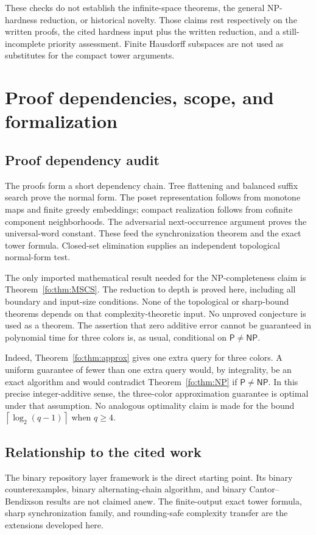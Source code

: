\documentclass[11pt,letterpaper]{article}
\numberwithin{equation}{section}
\theoremstyle{definition}
\theoremstyle{remark}
\theoremstyle{definition}
\newcommand{\ceil}[1]{\left\lceil#1\right\rceil}
\newcommand{\NP}{\mathsf{NP}}
\newcommand{\PT}{\mathsf{P}}
\begin{document}
These checks do not establish the infinite-space theorems, the general
NP-hardness reduction, or historical novelty. Those claims rest respectively
on the written proofs, the cited hardness input plus the written reduction,
and a still-incomplete priority assessment. Finite Hausdorff subspaces are not
used as substitutes for the compact tower arguments.

\section{Proof dependencies, scope, and formalization}
\label{fo:sec:audit}

\subsection{Proof dependency audit}
The proofs form a short dependency chain. Tree flattening and balanced suffix
search prove the normal form. The poset representation follows from monotone
maps and finite greedy embeddings; compact realization follows from cofinite
component neighborhoods. The adversarial next-occurrence argument proves the
universal-word constant. These feed the synchronization theorem and the exact
tower formula. Closed-set elimination supplies an independent topological
normal-form test.

The only imported mathematical result needed for the NP-completeness claim is
Theorem~\ref{fo:thm:MSCS}. The reduction to depth is proved here, including all
boundary and input-size conditions. None of the topological or sharp-bound
theorems depends on that complexity-theoretic input. No unproved conjecture is
used as a theorem. The assertion that zero additive error cannot be guaranteed
in polynomial time for three colors is, as usual, conditional on
$\PT\ne\NP$.

Indeed, Theorem~\ref{fo:thm:approx} gives one extra query for three colors. A
uniform guarantee of fewer than one extra query would, by integrality, be an
exact algorithm and would contradict Theorem~\ref{fo:thm:NP} if $\PT\ne\NP$.
In this precise integer-additive sense, the three-color approximation guarantee
is optimal under that assumption. No analogous optimality claim is made for
the bound $\ceil{\log_2(q-1)}$ when $q\ge4$.

\subsection{Relationship to the cited work}
The binary repository layer framework is the direct starting point. Its
binary counterexamples, binary alternating-chain algorithm, and binary
Cantor--Bendixson results are not claimed anew. The finite-output exact tower
formula, sharp synchronization family, and rounding-safe complexity transfer
are the extensions developed here.
\end{document}
